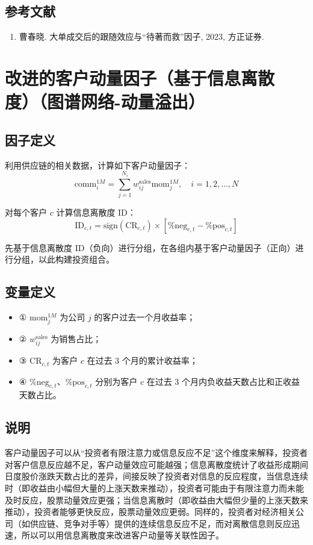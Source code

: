 \documentclass{article}
\begin{document}
\subsection{参考文献}
\begin{enumerate}
    \item 曹春晓. 大单成交后的跟随效应与“待著而救”因子, 2023, 方正证券.
\end{enumerate}

\section{改进的客户动量因子（基于信息离散度）（图谱网络-动量溢出）}

\subsection{因子定义}
利用供应链的相关数据，计算如下客户动量因子：
\begin{equation}
    \mathrm{comm}_i^{1M} = \sum_{j=1}^{N_i} w_{ij}^{\mathrm{sales}} \mathrm{mom}_j^{1M}, \quad i=1,2,\ldots,N
\end{equation}

对每个客户 \( c \) 计算信息离散度 ID：
\begin{equation}
    \mathrm{ID}_{c,t} = \mathrm{sign}(\mathrm{CR}_{c,t}) \times [\%\mathrm{neg}_{c,t} - \%\mathrm{pos}_{c,t}]
\end{equation}

先基于信息离散度 ID（负向）进行分组，在各组内基于客户动量因子（正向）进行分组，以此构建投资组合。

\subsection{变量定义}
\begin{itemize}
    \item ① \( \mathrm{mom}_j^{1M} \) 为公司 \( j \) 的客户过去一个月收益率；
    \item ② \( w_{ij}^{\mathrm{sales}} \) 为销售占比；
    \item ③ \( \mathrm{CR}_{c,t} \) 为客户 \( c \) 在过去 3 个月的累计收益率；
    \item ④ \( \%\mathrm{neg}_{c,t} \)、\( \%\mathrm{pos}_{c,t} \) 分别为客户 \( c \) 在过去 3 个月内负收益天数占比和正收益天数占比。
\end{itemize}

\subsection{说明}
客户动量因子可以从“投资者有限注意力或信息反应不足”这个维度来解释，投资者对客户信息反应越不足，客户动量效应可能越强；信息离散度统计了收益形成期间日度股价涨跌天数占比的差异，间接反映了投资者对信息的反应程度，当信息连续时（即收益由小幅但大量的上涨天数来推动），投资者可能由于有限注意力而未能及时反应，股票动量效应更强；当信息离散时（即收益由大幅但少量的上涨天数来推动），投资者能够更快反应，股票动量效应更弱。同样的，投资者对经济相关公司（如供应链、竞争对手等）提供的连续信息反应不足，而对离散信息则反应迅速，所以可以用信息离散度来改进客户动量等关联性因子。
\end{document}
